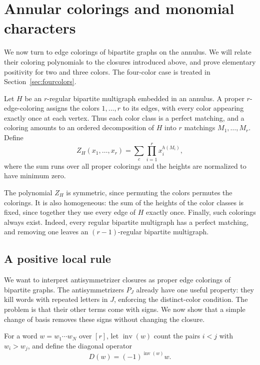 \documentclass[11pt]{article}
\theoremstyle{definition}
\theoremstyle{remark}
\begin{document}
\section{Annular colorings and monomial characters}\label{sec:colorings}

We now turn to edge colorings of bipartite graphs on
the annulus. We will relate their coloring polynomials
to the closures introduced above, and prove elementary
positivity for two and three colors. The four-color
case is treated in Section~\ref{sec:fourcolors}.


Let $H$ be an $r$-regular bipartite multigraph
embedded in an annulus. A proper $r$-edge-coloring
assigns the colors $1,\ldots,r$ to its edges,
with every color appearing exactly once at each
vertex. Thus each color class is a perfect matching,
and a coloring amounts to an ordered decomposition
of $H$ into $r$ matchings $M_1,\ldots,M_r$.
Define
\begin{equation}\label{eq:ZH}
Z_H(x_1,\ldots,x_r)
=\sum_c\prod_{i=1}^r x_i^{h(M_i)},
\end{equation}
where the sum runs over all proper colorings and
the heights are normalized to have minimum zero.

The polynomial $Z_H$ is symmetric, since permuting
the colors permutes the colorings. It is also
homogeneous: the sum of the heights of the color
classes is fixed, since together they use every
edge of $H$ exactly once. Finally, such colorings
always exist. Indeed, every regular bipartite
multigraph has a perfect matching, and removing
one leaves an $(r-1)$-regular bipartite multigraph.




\subsection{A positive local rule}

We want to interpret antisymmetrizer closures as
proper edge colorings of bipartite graphs. The
antisymmetrizers $P_J$ already have one useful
property: they kill words with repeated letters
in $J$, enforcing the distinct-color condition.
The problem is that their other terms come with
signs. We now show that a simple change of basis
removes these signs without changing the closure.

For a word $w=w_1\cdots w_N$ over $[r]$, let
$\operatorname{inv}(w)$ count the pairs $i<j$
with $w_i>w_j$, and define the diagonal operator
\[
D(w)=(-1)^{\operatorname{inv}(w)}w.
\]
\end{document}
